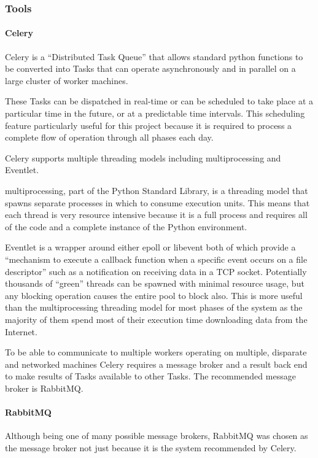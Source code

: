 \subsubsection{Tools}
\paragraph{Celery}
Celery is a ``Distributed Task Queue'' that allows standard python functions to be converted into Tasks that can operate asynchronously and in parallel on a large cluster of worker machines.

These Tasks can be dispatched in real-time or can be scheduled to take place at a particular time in the future, or at a predictable time intervals.  This scheduling feature particularly useful for this project because it is required to process a complete flow of operation through all phases each day.

Celery supports multiple threading models including multiprocessing and Eventlet.

multiprocessing, part of the Python Standard Library, is a threading model that spawns separate processes in which to consume execution units.  This means that each thread is very resource intensive because it is a full process and requires all of the code and a complete instance of the Python environment.

Eventlet is a wrapper around either epoll or libevent both of which provide a ``mechanism to execute a callback function when a specific event occurs on a file descriptor'' such as a notification on receiving data in a TCP socket.  Potentially thousands of ``green'' threads can be spawned with minimal resource usage, but any blocking operation causes the entire pool to block also. This is more useful than the multiprocessing threading model for most phases of the system as the majority of them spend most of their execution time downloading data from the Internet.

To be able to communicate to multiple workers operating on multiple, disparate and networked machines Celery requires a message broker and a result back end to make results of Tasks available to other Tasks.  The recommended message broker is RabbitMQ.

\paragraph{RabbitMQ}
Although being one of many possible message brokers, RabbitMQ was chosen as the message broker not just because it is the system recommended by Celery.

